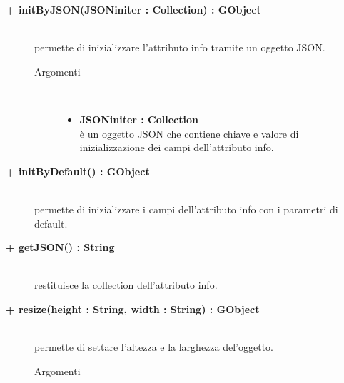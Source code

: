 \begin{description}
\begin{description}
\end{description}

\begin{description}
		\item[\textbf{\color{blue}+ initByJSON(JSONiniter : Collection) : GObject			}] \hfill \\
			permette di inizializzare l'attributo info tramite un oggetto JSON. 
			
		\begin{description}
			\item[Argomenti] \hfill \\
				\begin{itemize}
				
					\item \textbf{JSONiniter : Collection			} \hfill \\
					è un oggetto JSON che contiene chiave e valore di inizializzazione dei campi dell'attributo info. 
				\end{itemize}
		\end{description}

\end{description}

\begin{description}
		\item[\textbf{\color{blue}+ initByDefault() : GObject			}] \hfill \\
			permette di inizializzare i campi dell'attributo info con i parametri di default. 

\end{description}

\begin{description}
		\item[\textbf{\color{blue}+ getJSON() : String			}] \hfill \\
			restituisce la collection dell'attributo info.

\end{description}

\begin{description}
		\item[\textbf{\color{blue}+ resize(height : String, width : String) : GObject			}] \hfill \\
			permette di settare l'altezza e la larghezza del'oggetto.
			
		\begin{description}
			\item[Argomenti] \hfill \\
				\begin{itemize}
				

\end{itemize}
\end{description}
\end{description}
\end{description}
